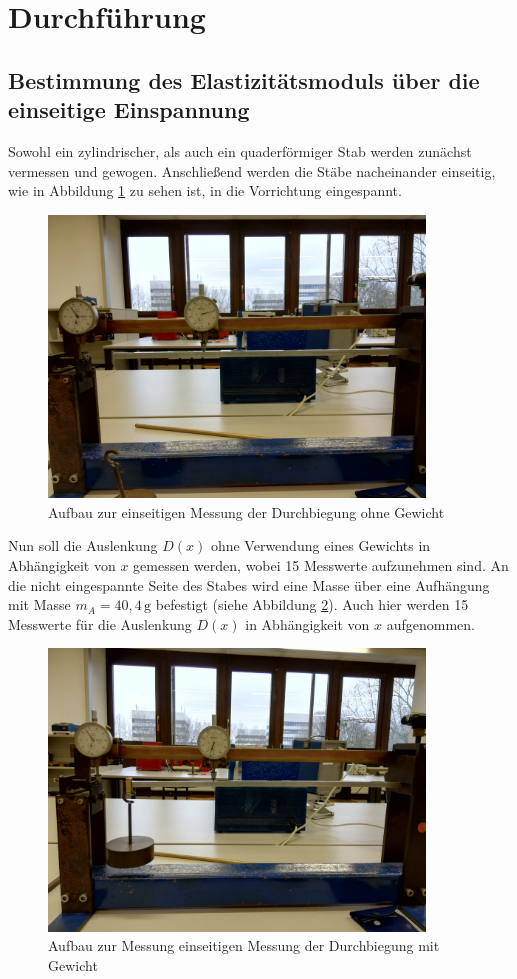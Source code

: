 \section{Durchführung}
\label{sec:Durchführung}

\subsection{Bestimmung des Elastizitätsmoduls über die einseitige Einspannung}

Sowohl ein zylindrischer, als auch ein quaderförmiger Stab werden zunächst vermessen und gewogen.
Anschließend werden die Stäbe nacheinander einseitig, wie in Abbildung \ref{fig:durchfuehrung1} 
zu sehen ist, in die Vorrichtung eingespannt. 

\begin{figure}[H]
    \centering
    \includegraphics[width=10cm]{1.jpg}
    \caption{Aufbau zur einseitigen Messung der Durchbiegung ohne Gewicht}
    \label{fig:durchfuehrung1}
\end{figure}
\noindent
Nun soll die Auslenkung $D(x)$ ohne Verwendung eines Gewichts in 
Abhängigkeit von $x$ gemessen werden, wobei 15 Messwerte aufzunehmen sind. An die nicht eingespannte 
Seite des Stabes wird eine Masse über eine Aufhängung mit Masse $m_{A} = 40,4\, \si{\gram}$ befestigt
(siehe Abbildung \ref{fig:durchfuehrung2}). Auch hier werden 15 Messwerte für die Auslenkung $D(x)$ in 
Abhängigkeit von $x$ aufgenommen. 

\begin{figure}[H]
    \centering
    \includegraphics[width=10cm]{2.jpg}
    \caption{Aufbau zur Messung einseitigen Messung der Durchbiegung mit Gewicht}
    \label{fig:durchfuehrung2}
\end{figure}
\noindent


